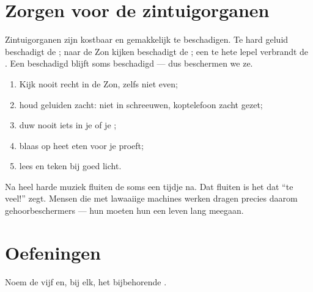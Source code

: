 \section{Zorgen voor de zintuigorganen}

\begin{proposition}\label{prop:g1:the-five-senses:fragile}
Zintuigorganen zijn kostbaar en gemakkelijk te beschadigen. Te hard
geluid beschadigt de ; naar de Zon kijken beschadigt de ; een
te hete lepel verbrandt de . Een beschadigd  blijft
soms beschadigd --- dus beschermen we ze.
\end{proposition}
\admitted

\begin{method}\label{met:g1:the-five-senses:protect}
\begin{enumerate}
  \item Kijk nooit recht in de Zon, zelfs niet even;
  \item houd geluiden zacht: niet in  schreeuwen, koptelefoon zacht
        gezet;
  \item duw nooit iets in je  of je ;
  \item blaas op heet eten voor je proeft;
  \item lees en teken bij goed licht.
\end{enumerate}
\end{method}

\begin{example}\label{ex:g1:the-five-senses:loud}
Na heel harde muziek fluiten de  soms een tijdje na. Dat fluiten is
het  dat ``te veel!'' zegt. Mensen die met lawaaiige machines werken
dragen precies daarom gehoorbeschermers --- hun  moeten hun een
leven lang meegaan.
\end{example}

\section{Oefeningen}

\begin{exercise}[$\star$]\label{exo:g1:the-five-senses:1}
Noem de vijf  en, bij elk, het bijbehorende .
\end{exercise}


